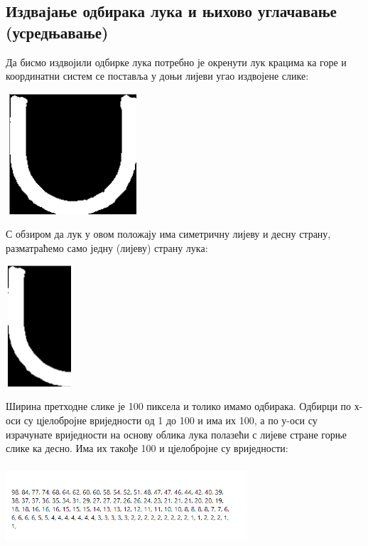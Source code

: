 \documentclass[12pt]{article}
\begin{document}
\newpage
\subsection{Издвајање одбирака лука и њихово углачавање (усредњавање)}
Да бисмо издвојили одбирке лука потребно је окренути лук крацима ка горе и координатни систем се поставља у доњи лијеви угао издвојене слике:
\vspace{0.5cm}
\begin{center}
    \centering 
    \includegraphics[height=4.5cm, width=5cm]{images/9_za_odbirke.png}
\end{center}
\vspace{0.5cm}
С обзиром да лук у овом положају има симетричну лијеву и десну страну, разматраћемо само једну (лијеву) страну лука:
\vspace{0.5cm}
\begin{center}
    \centering 
    \includegraphics[height=4.5cm, width=2.5cm]{images/10_za_odbirke_pola.png}
\end{center}
\vspace{0.5cm}
Ширина претходне слике је 100 пиксела и толико имамо одбирака. Одбирци по х-оси су цјелобројне вриједности од 1 до 100 и има их 100, а по у-оси су израчунате вриједности на основу облика лука полазећи с лијеве стране горње слике ка десно. Има их такође 100 и цјелобројне су вриједности:
\vspace{0.5cm}
\begin{center}
    \centering 
    \includegraphics[height=3cm, width=9cm]{images/11_odbirci.png}
\end{center}
\end{document}
